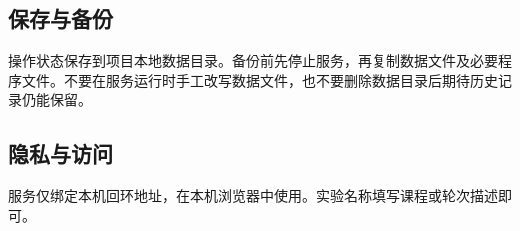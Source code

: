 \documentclass[UTF8,fontset=windows,zihao=-4]{ctexart}
\begin{document}
\subsection{保存与备份}

操作状态保存到项目本地数据目录。备份前先停止服务，再复制数据文件及必要程序文件。不要在服务运行时手工改写数据文件，也不要删除数据目录后期待历史记录仍能保留。

\subsection{隐私与访问}

服务仅绑定本机回环地址，在本机浏览器中使用。实验名称填写课程或轮次描述即可。
\end{document}
